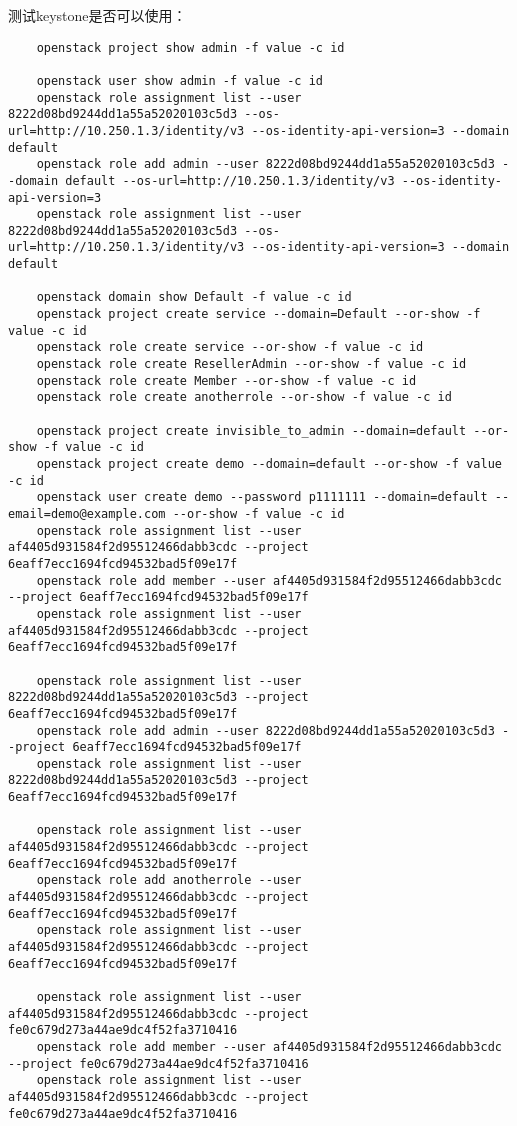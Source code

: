 \documentclass[a4paper,left=1.5cm,right=1.5cm,11pt]{article}
\begin{document}
	测试keystone是否可以使用：
	\begin{lstlisting}
	openstack project show admin -f value -c id

	openstack user show admin -f value -c id
	openstack role assignment list --user 8222d08bd9244dd1a55a52020103c5d3 --os-url=http://10.250.1.3/identity/v3 --os-identity-api-version=3 --domain default
	openstack role add admin --user 8222d08bd9244dd1a55a52020103c5d3 --domain default --os-url=http://10.250.1.3/identity/v3 --os-identity-api-version=3
	openstack role assignment list --user 8222d08bd9244dd1a55a52020103c5d3 --os-url=http://10.250.1.3/identity/v3 --os-identity-api-version=3 --domain default
	
	openstack domain show Default -f value -c id
	openstack project create service --domain=Default --or-show -f value -c id
	openstack role create service --or-show -f value -c id
	openstack role create ResellerAdmin --or-show -f value -c id
	openstack role create Member --or-show -f value -c id
	openstack role create anotherrole --or-show -f value -c id
	
	openstack project create invisible_to_admin --domain=default --or-show -f value -c id
	openstack project create demo --domain=default --or-show -f value -c id
	openstack user create demo --password p1111111 --domain=default --email=demo@example.com --or-show -f value -c id
	openstack role assignment list --user af4405d931584f2d95512466dabb3cdc --project 6eaff7ecc1694fcd94532bad5f09e17f
	openstack role add member --user af4405d931584f2d95512466dabb3cdc --project 6eaff7ecc1694fcd94532bad5f09e17f
	openstack role assignment list --user af4405d931584f2d95512466dabb3cdc --project 6eaff7ecc1694fcd94532bad5f09e17f
	
	openstack role assignment list --user 8222d08bd9244dd1a55a52020103c5d3 --project 6eaff7ecc1694fcd94532bad5f09e17f
	openstack role add admin --user 8222d08bd9244dd1a55a52020103c5d3 --project 6eaff7ecc1694fcd94532bad5f09e17f
	openstack role assignment list --user 8222d08bd9244dd1a55a52020103c5d3 --project 6eaff7ecc1694fcd94532bad5f09e17f
	
	openstack role assignment list --user af4405d931584f2d95512466dabb3cdc --project 6eaff7ecc1694fcd94532bad5f09e17f
	openstack role add anotherrole --user af4405d931584f2d95512466dabb3cdc --project 6eaff7ecc1694fcd94532bad5f09e17f
	openstack role assignment list --user af4405d931584f2d95512466dabb3cdc --project 6eaff7ecc1694fcd94532bad5f09e17f
	
	openstack role assignment list --user af4405d931584f2d95512466dabb3cdc --project fe0c679d273a44ae9dc4f52fa3710416
	openstack role add member --user af4405d931584f2d95512466dabb3cdc --project fe0c679d273a44ae9dc4f52fa3710416
	openstack role assignment list --user af4405d931584f2d95512466dabb3cdc --project fe0c679d273a44ae9dc4f52fa3710416
	

\end{lstlisting}
\end{document}
